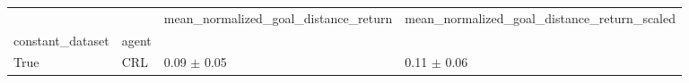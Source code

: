 \begin{tabular}{llll}
\toprule
 &  & mean_normalized_goal_distance_return & mean_normalized_goal_distance_return_scaled \\
constant_dataset & agent &  &  \\
\midrule
True & CRL & 0.09 $\pm$ 0.05 & 0.11 $\pm$ 0.06 \\
\cline{1-4}
\bottomrule
\end{tabular}
